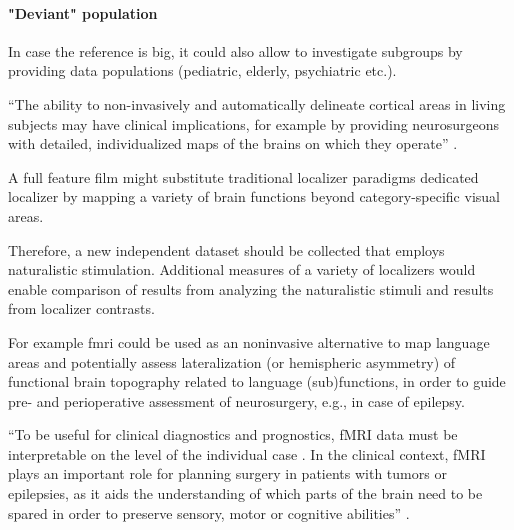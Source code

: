 \paragraph{"Deviant" population}



%
In case the reference is big, it could also allow to investigate subgroups by
providing data populations (pediatric, elderly, psychiatric etc.).

%
``The ability to non-invasively and automatically delineate cortical areas in
living subjects may have clinical implications, for example by providing
neurosurgeons with detailed, individualized maps of the brains on which they
operate'' \citep{glasser2016multi}.

%
A full feature film might substitute traditional localizer paradigms dedicated
localizer by mapping a variety of brain functions beyond category-specific
visual areas.

%
Therefore, a new independent dataset should be collected that employs
naturalistic stimulation.
%
Additional measures of a variety of localizers would enable comparison of
results from analyzing the naturalistic stimuli and results from localizer
contrasts.

%
For example \ac{fmri} could be used as an noninvasive alternative to map
language areas and potentially assess lateralization (or hemispheric asymmetry)
of functional brain topography related to language (sub)functions, in order to
guide pre- and perioperative assessment of neurosurgery, e.g., in case of
epilepsy.

%
``To be useful for clinical diagnostics and prognostics, fMRI data must be
interpretable on the level of the individual case \citep{dubois2016building}.
%
In the clinical context, fMRI plays an important role for planning surgery in
patients with tumors or epilepsies, as it aids the understanding of which parts
of the brain need to be spared in order to preserve sensory, motor or cognitive
abilities'' \citep{wegrzyn2018thought}.



